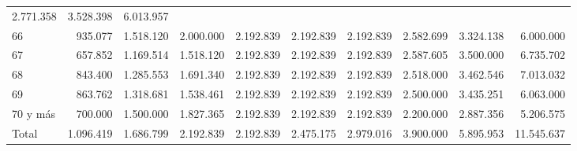 \begin{tabular}{llllllllll}
  \multicolumn{1}{r}{2.771.358} &
  \multicolumn{1}{r}{3.528.398} &
  \multicolumn{1}{r}{6.013.957} \\
\multicolumn{1}{l}{\hspace{1em}66} &
  \multicolumn{1}{|r}{935.077} &
  \multicolumn{1}{r}{1.518.120} &
  \multicolumn{1}{r}{2.000.000} &
  \multicolumn{1}{r}{2.192.839} &
  \multicolumn{1}{r}{2.192.839} &
  \multicolumn{1}{r}{2.192.839} &
  \multicolumn{1}{r}{2.582.699} &
  \multicolumn{1}{r}{3.324.138} &
  \multicolumn{1}{r}{6.000.000} \\
\multicolumn{1}{l}{\hspace{1em}67} &
  \multicolumn{1}{|r}{657.852} &
  \multicolumn{1}{r}{1.169.514} &
  \multicolumn{1}{r}{1.518.120} &
  \multicolumn{1}{r}{2.192.839} &
  \multicolumn{1}{r}{2.192.839} &
  \multicolumn{1}{r}{2.192.839} &
  \multicolumn{1}{r}{2.587.605} &
  \multicolumn{1}{r}{3.500.000} &
  \multicolumn{1}{r}{6.735.702} \\
\multicolumn{1}{l}{\hspace{1em}68} &
  \multicolumn{1}{|r}{843.400} &
  \multicolumn{1}{r}{1.285.553} &
  \multicolumn{1}{r}{1.691.340} &
  \multicolumn{1}{r}{2.192.839} &
  \multicolumn{1}{r}{2.192.839} &
  \multicolumn{1}{r}{2.192.839} &
  \multicolumn{1}{r}{2.518.000} &
  \multicolumn{1}{r}{3.462.546} &
  \multicolumn{1}{r}{7.013.032} \\
\multicolumn{1}{l}{\hspace{1em}69} &
  \multicolumn{1}{|r}{863.762} &
  \multicolumn{1}{r}{1.318.681} &
  \multicolumn{1}{r}{1.538.461} &
  \multicolumn{1}{r}{2.192.839} &
  \multicolumn{1}{r}{2.192.839} &
  \multicolumn{1}{r}{2.192.839} &
  \multicolumn{1}{r}{2.500.000} &
  \multicolumn{1}{r}{3.435.251} &
  \multicolumn{1}{r}{6.063.000} \\
\multicolumn{1}{l}{\hspace{1em}70 y más} &
  \multicolumn{1}{|r}{700.000} &
  \multicolumn{1}{r}{1.500.000} &
  \multicolumn{1}{r}{1.827.365} &
  \multicolumn{1}{r}{2.192.839} &
  \multicolumn{1}{r}{2.192.839} &
  \multicolumn{1}{r}{2.192.839} &
  \multicolumn{1}{r}{2.200.000} &
  \multicolumn{1}{r}{2.887.356} &
  \multicolumn{1}{r}{5.206.575} \\
\multicolumn{1}{l}{\hspace{1em}Total} &
  \multicolumn{1}{|r}{1.096.419} &
  \multicolumn{1}{r}{1.686.799} &
  \multicolumn{1}{r}{2.192.839} &
  \multicolumn{1}{r}{2.192.839} &
  \multicolumn{1}{r}{2.475.175} &
  \multicolumn{1}{r}{2.979.016} &
  \multicolumn{1}{r}{3.900.000} &
  \multicolumn{1}{r}{5.895.953} &
  \multicolumn{1}{r}{11.545.637} \\
\cline{1-10}
\end{tabular}

